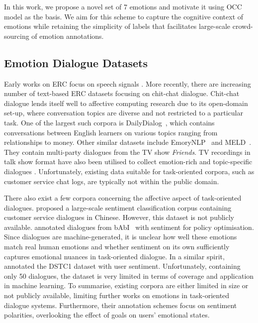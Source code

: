 \documentclass[10pt, a4paper]{article}
\begin{document}
In this work, we propose a novel set of 7 emotions and motivate it using OCC model as the basis. We aim for this scheme to capture the cognitive context of emotions while retaining the simplicity of labels that facilitates large-scale crowd-sourcing of emotion annotations.\par

\subsection{Emotion Dialogue Datasets}
Early works on ERC focus on speech signals \cite{911197,Riccardi2005GroundingEI,Carrin2008InfluenceOC}. More recently, there are increasing number of text-based ERC datasets focusing on chit-chat dialogue. Chit-chat dialogue lends itself well to affective computing research due to its open-domain set-up, where conversation topics are diverse and not restricted to a particular task. One of the largest such corpora is DailyDialog~\cite{li-etal-2017-dailydialog}, which contains conversations between English learners on various topics ranging from relationships to money. Other similar datasets include EmoryNLP~\cite{zahiri:18a} and MELD~\cite{poria-etal-2019-meld}. They contain multi-party dialogues from the TV show \textit{Friends}. TV recordings in talk show format have also been utilised to collect emotion-rich and topic-specific dialogues \cite{lubis2015construction}. Unfortunately, existing data suitable for task-oriented corpora, such as customer service chat logs, are typically not within the public domain.\par

There also exist a few corpora concerning the affective aspect of task-oriented dialogues.  proposed a large-scale sentiment classification corpus containing customer service dialogues in Chinese. However, this dataset is not publicly available.  annotated dialogues from bAbI~\cite{BordesBW17} with sentiment for policy optimisation. Since dialogues are machine-generated, it is unclear how well these emotions match real human emotions and whether sentiment on its own sufficiently captures emotional nuances in task-oriented dialogue. In a similar spirit,  annotated the DSTC1 dataset with user sentiment. Unfortunately, containing only 50 dialogues, the dataset is very limited in terms of coverage and application in machine learning. To summarise, existing corpora are either limited in size or not publicly available, limiting further works on emotions in task-oriented dialogue systems. Furthermore, their annotation schemes focus on sentiment polarities, overlooking the effect of goals on users' emotional states. 
\end{document}
